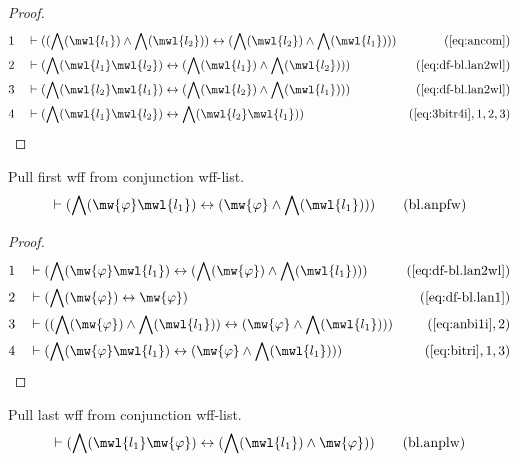\begin{proof}
\begin{align}
  1 &&  & \vdash ( ( \bigwedge( \mwl{l_1} ) \wedge \bigwedge( \mwl{l_2} ) ) \leftrightarrow ( \bigwedge( \mwl{l_2} ) \wedge \bigwedge( \mwl{l_1} ) ) )&(\mbox{\ref{eq:ancom}})\notag
  \\ 2 &&  & \vdash ( \bigwedge( \mwl{l_1} \mwl{l_2} ) \leftrightarrow ( \bigwedge( \mwl{l_1} ) \wedge \bigwedge( \mwl{l_2} ) ) )&(\mbox{\ref{eq:df-bl.lan2wl}})\notag
  \\ 3 &&  & \vdash ( \bigwedge( \mwl{l_2} \mwl{l_1} ) \leftrightarrow ( \bigwedge( \mwl{l_2} ) \wedge \bigwedge( \mwl{l_1} ) ) )&(\mbox{\ref{eq:df-bl.lan2wl}})\notag
  \\ 4 &&  & \vdash ( \bigwedge( \mwl{l_1} \mwl{l_2} ) \leftrightarrow \bigwedge( \mwl{l_2} \mwl{l_1} ) )&(\mbox{\ref{eq:3bitr4i}},1,2,3)\notag
\end{align}
\end{proof}

\begin{lemma} Pull first wff from conjunction wff-list.
\begin{align}
\vdash ( \bigwedge( \mw{\varphi} \mwl{l_1} ) \leftrightarrow ( \mw{\varphi}
    \wedge \bigwedge( \mwl{l_1} ) ) )\label{eq:bl.anpfw}\tag{bl.anpfw}
\end{align}
\end{lemma}

\begin{proof}
\begin{align}
  1 &&  & \vdash ( \bigwedge( \mw{\varphi} \mwl{l_1} ) \leftrightarrow ( \bigwedge( \mw{\varphi} ) \wedge \bigwedge( \mwl{l_1} ) ) )&(\mbox{\ref{eq:df-bl.lan2wl}})\notag
  \\ 2 &&  & \vdash ( \bigwedge( \mw{\varphi} ) \leftrightarrow \mw{\varphi} )&(\mbox{\ref{eq:df-bl.lan1}})\notag
  \\ 3 &&  & \vdash ( ( \bigwedge( \mw{\varphi} ) \wedge \bigwedge( \mwl{l_1} ) ) \leftrightarrow ( \mw{\varphi} \wedge \bigwedge( \mwl{l_1} ) ) )&(\mbox{\ref{eq:anbi1i}},2)\notag
  \\ 4 &&  & \vdash ( \bigwedge( \mw{\varphi} \mwl{l_1} ) \leftrightarrow ( \mw{\varphi} \wedge \bigwedge( \mwl{l_1} ) ) )&(\mbox{\ref{eq:bitri}},1,3)\notag
\end{align}
\end{proof}

\begin{lemma} Pull last wff from conjunction wff-list.
\begin{align}
\vdash ( \bigwedge( \mwl{l_1} \mw{\varphi} ) \leftrightarrow ( \bigwedge(
    \mwl{l_1} ) \wedge \mw{\varphi} ) )\label{eq:bl.anplw}\tag{bl.anplw}
\end{align}
\end{lemma}


